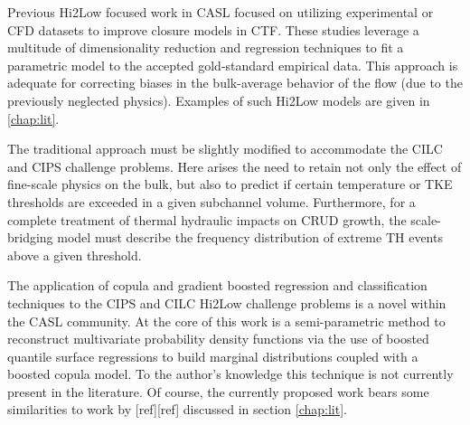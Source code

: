 Previous Hi2Low focused work in CASL focused on utilizing experimental or CFD
datasets to improve closure models in CTF.  These studies leverage a multitude of
dimensionality reduction and regression techniques
to fit a parametric model to the accepted gold-standard empirical data.  This approach
is adequate for correcting biases in the bulk-average behavior of the flow (due to
the previously neglected physics).  Examples of such Hi2Low models are given in
\autoref{chap:lit}.

The traditional approach must be slightly modified to accommodate the CILC and
CIPS challenge problems.  Here arises the need to retain not only the effect of
fine-scale physics on the bulk, but also to predict if certain
temperature or TKE thresholds are exceeded in a given subchannel
volume.  Furthermore, for a complete treatment of thermal hydraulic impacts on
CRUD growth, the scale-bridging model must describe the frequency
distribution of extreme TH events above a given threshold.

The application of copula and gradient boosted regression and classification
techniques to the CIPS and CILC Hi2Low challenge problems is a novel within the CASL community.
At the core of this work is a semi-parametric method to reconstruct multivariate probability density functions via the use of boosted quantile surface regressions to build marginal distributions coupled with a boosted copula model.  To the author's knowledge this technique is not currently present in the literature.
Of course, the currently proposed work bears some similarities to work by [ref][ref] discussed in section \autoref{chap:lit}.

